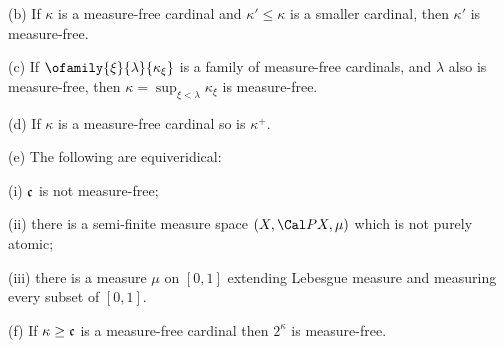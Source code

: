 (b) If $\kappa$ is a measure-free cardinal and $\kappa'\le\kappa$ is
a smaller cardinal, then $\kappa'$ is measure-free.

(c) If $\ofamily{\xi}{\lambda}{\kappa_{\xi}}$ is a family of
measure-free cardinals, and $\lambda$ also is measure-free, then
$\kappa=\sup_{\xi<\lambda}\kappa_{\xi}$ is measure-free.

(d) If $\kappa$ is a measure-free cardinal so is $\kappa^+$.

(e) The following are equiveridical:

\quad(i) $\frak c$ is not measure-free;

\quad(ii) there is a semi-finite measure space $(X,\Cal PX,\mu)$ which
is not purely atomic;

\quad(iii) there is a measure $\mu$ on $[0,1]$ extending Lebesgue
measure and measuring every subset of $[0,1]$.

(f) If $\kappa\ge\frak c$ is a measure-free cardinal then
$2^{\kappa}$ is measure-free.

